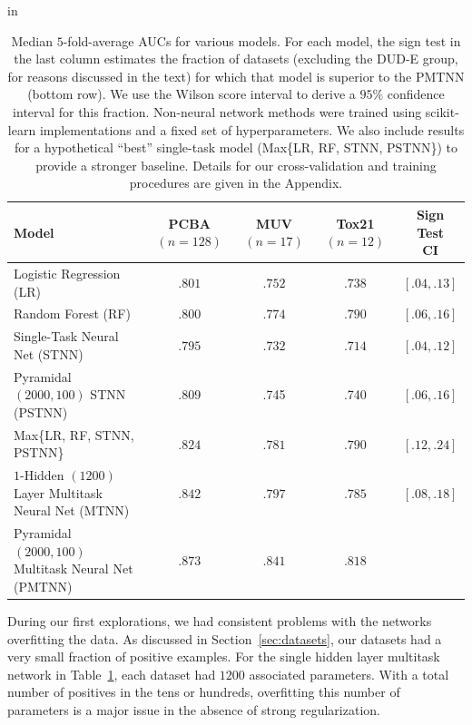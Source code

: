 \begin{table}[t]
\small
\caption{Median $5$-fold-average AUCs for various models.  For each model,
  the sign test in the last column estimates the fraction of datasets
  (excluding the DUD-E group, for reasons discussed in the text) for which
  that model is superior to the PMTNN (bottom row). We use the Wilson score interval to
  derive a $95\%$ confidence interval for this fraction.  Non-neural
  network methods were trained using scikit-learn
  \cite{pedregosa2011scikit} implementations and a fixed set of hyperparameters.
  We also include results for a hypothetical ``best''
  single-task model (Max\{LR, RF, STNN, PSTNN\}) to provide a stronger
  baseline. Details for our cross-validation and training procedures are
  given in the Appendix.}
\label{tab:exp_results}
 in
\centering
\begin{tabular}{lcccc}
\toprule
Model & \makecell{PCBA \\ $(n=128)$} & \makecell{MUV \\ $(n=17)$} &
\makecell{Tox21 \\ $(n=12)$} & \makecell{Sign Test \\ CI} \\
\midrule
Logistic Regression (LR)& $.801$  & $.752$ & $.738$ & $[.04, .13]$ \\
Random Forest (RF) & $.800$  & $.774$  & $.790$ & $[.06, .16]$ \\
Single-Task Neural Net (STNN) & $.795$ & $.732$ & $.714$ & $[.04, .12]$ \\
Pyramidal $(2000, 100)$ STNN (PSTNN) & .809 & .745 & .740 & $[.06, .16]$ \\
Max\{LR, RF, STNN, PSTNN\} & $.824$ & $.781$ & $.790$ & $[.12, .24]$ \\
$1$-Hidden $(1200)$ Layer Multitask Neural Net (MTNN) & $.842$ & $.797$ & $.785$ & $[.08, .18]$ \\
Pyramidal $(2000, 100)$ Multitask Neural Net (PMTNN) & $\mathbf{.873}$ &
$\mathbf{.841}$ & $\mathbf{.818}$ & \\
\bottomrule
\end{tabular}
\end{table}

During our first explorations, we had consistent problems with the networks
overfitting the data. As discussed in Section~\ref{sec:datasets}, our
datasets had a very small fraction of positive examples. For the single
hidden layer multitask network in Table~\ref{tab:exp_results}, each dataset
had $1200$ associated parameters. With a total number of positives in the
tens or hundreds, overfitting this number of parameters is a major issue in
the absence of strong regularization.

